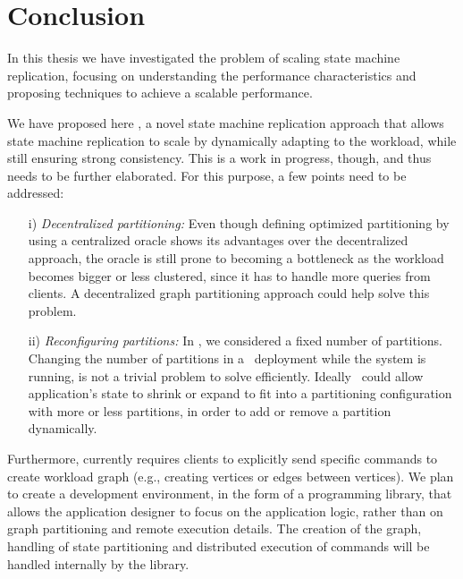 \chapter[Conclusion]{Conclusion}

In this thesis we have investigated the problem of scaling state machine
replication, focusing on understanding the performance characteristics and
proposing techniques to achieve a scalable performance.


We have proposed here \dynastar, a novel state machine replication approach that
allows state machine replication to scale by dynamically adapting to the
workload, while still ensuring strong consistency. This is a work in progress,
though, and thus needs to be further elaborated. For this purpose, a few points
need to be addressed:

\begin{itemize}

    \item[i)]\emph{Decentralized partitioning:}
    Even though defining optimized partitioning by using a centralized oracle
    shows its advantages over the decentralized approach, the oracle is still
    prone to becoming a bottleneck as the workload becomes bigger or less
    clustered, since it has to handle more queries from clients. A decentralized
    graph partitioning approach could help solve this problem.

    \item[ii)]\emph{Reconfiguring partitions:}
    In \dynastar, we considered a fixed number of partitions. Changing the
    number of partitions in a \dynastar\ deployment while the system is running,
    is not a trivial problem to solve efficiently. Ideally \dynastar\ could
    allow application's state to shrink or expand to fit into a partitioning
    configuration with more or less partitions, in order to add or remove a
    partition dynamically.

\end{itemize}

Furthermore, \dynastar currently requires clients to explicitly send specific
commands to create workload graph (e.g., creating vertices or edges between
vertices). We plan to create a development environment, in the form of a
programming library, that allows the application designer to focus on the
application logic, rather than on graph partitioning and remote execution
details. The creation of the graph, handling of state partitioning and
distributed execution of commands will be handled internally by the library.

